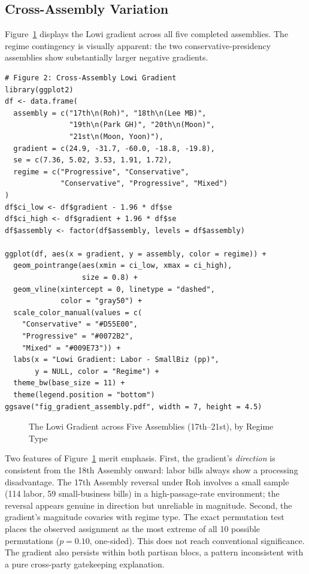 \documentclass[11pt]{article}
\begin{document}
\subsection{Cross-Assembly Variation}

Figure~\ref{fig:gradient} displays the Lowi gradient across all five completed assemblies. The regime contingency is visually apparent: the two conservative-presidency assemblies show substantially larger negative gradients.

\begin{verbatim}
# Figure 2: Cross-Assembly Lowi Gradient
library(ggplot2)
df <- data.frame(
  assembly = c("17th\n(Roh)", "18th\n(Lee MB)",
               "19th\n(Park GH)", "20th\n(Moon)",
               "21st\n(Moon, Yoon)"),
  gradient = c(24.9, -31.7, -60.0, -18.8, -19.8),
  se = c(7.36, 5.02, 3.53, 1.91, 1.72),
  regime = c("Progressive", "Conservative",
             "Conservative", "Progressive", "Mixed")
)
df$ci_low <- df$gradient - 1.96 * df$se
df$ci_high <- df$gradient + 1.96 * df$se
df$assembly <- factor(df$assembly, levels = df$assembly)

ggplot(df, aes(x = gradient, y = assembly, color = regime)) +
  geom_pointrange(aes(xmin = ci_low, xmax = ci_high),
                  size = 0.8) +
  geom_vline(xintercept = 0, linetype = "dashed",
             color = "gray50") +
  scale_color_manual(values = c(
    "Conservative" = "#D55E00",
    "Progressive" = "#0072B2",
    "Mixed" = "#009E73")) +
  labs(x = "Lowi Gradient: Labor - SmallBiz (pp)",
       y = NULL, color = "Regime") +
  theme_bw(base_size = 11) +
  theme(legend.position = "bottom")
ggsave("fig_gradient_assembly.pdf", width = 7, height = 4.5)
\end{verbatim}

\begin{figure}[H]
\centering
{}
\caption{The Lowi Gradient across Five Assemblies (17th--21st), by Regime Type}
\label{fig:gradient}
\end{figure}

Two features of Figure~\ref{fig:gradient} merit emphasis. First, the gradient's \emph{direction} is consistent from the 18th Assembly onward: labor bills always show a processing disadvantage. The 17th Assembly reversal under Roh involves a small sample (114 labor, 59 small-business bills) in a high-passage-rate environment; the reversal appears genuine in direction but unreliable in magnitude. Second, the gradient's magnitude covaries with regime type. The exact permutation test places the observed assignment as the most extreme of all 10 possible permutations ($p = 0.10$, one-sided). This does not reach conventional significance. The gradient also persists within both partisan blocs, a pattern inconsistent with a pure cross-party gatekeeping explanation.
\end{document}
